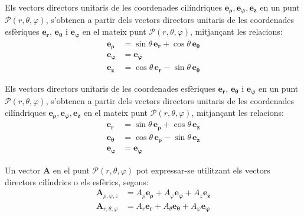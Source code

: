 \documentclass[catalan,a4paper,twoside,11pt]{article}
\begin{document}
Els vectors directors unitaris de les coordenades cilíndriques $\boldsymbol{e_\rho},\boldsymbol{e_\varphi},\boldsymbol{e_z}$  en un punt $\mathscr{P}(r,\theta,\varphi)$, s'obtenen a partir dels vectors directors unitaris de les coordenades esfèriques $\boldsymbol{e_r}$, $\boldsymbol{e_\theta}$ i $\boldsymbol{e_\varphi}$ en el mateix punt $\mathscr{P}(r,\theta,\varphi)$,
mitjançant les relacions:
\begin{subequations}\begin{align}
		\boldsymbol{e_\rho} &=\sin\theta\,\boldsymbol{e_r}+
		\cos\theta\,\boldsymbol{e_\theta}\\
		\boldsymbol{e_\varphi}&=\boldsymbol{e_\varphi}\\
		\boldsymbol{e_z} &=\cos\theta\,\boldsymbol{e_r}-
		\sin\theta\,\boldsymbol{e_\theta}
\end{align}\end{subequations}


Els vectors directors unitaris de les coordenades esfèriques  $\boldsymbol{e_r}$, $\boldsymbol{e_\theta}$ i $\boldsymbol{e_\varphi}$ en un punt $\mathscr{P}(r,\theta,\varphi)$, s'obtenen a partir dels vectors directors unitaris de les coordenades cilíndriques $\boldsymbol{e_\rho},\boldsymbol{e_\varphi},\boldsymbol{e_z}$ en el mateix punt $\mathscr{P}(r,\theta,\varphi)$, mitjançant les relacions:
\begin{subequations}\begin{align}
    \boldsymbol{e_r} &=\sin\theta\,\boldsymbol{e_\rho}+\cos\theta\,\boldsymbol{e_z}\\
    \boldsymbol{e_\theta}
    &=\cos\theta\,\boldsymbol{e_\rho}-\sin\theta\,\boldsymbol{e_z}\\
    \boldsymbol{e_\varphi}&=\boldsymbol{e_\varphi}
\end{align}\end{subequations}

Un vector $\boldsymbol{A}$ en el punt $\mathscr{P}(r, \theta, \varphi)$ pot expressar-se utilitzant els vectors directors cilíndrics o els esfèrics, segons:
\begin{subequations}\begin{align}
		\boldsymbol{A}_{\rho,\varphi,z} &= A_\rho \boldsymbol{e_\rho} + A_\varphi \boldsymbol{e_\varphi} + A_z \boldsymbol{e_z} \\
		\boldsymbol{A}_{r,\theta,\varphi} &= A_r  \boldsymbol{e_r} + A_\theta \boldsymbol{e_\theta} + A_\varphi \boldsymbol{e_\varphi}
\end{align}\end{subequations}
\end{document}
